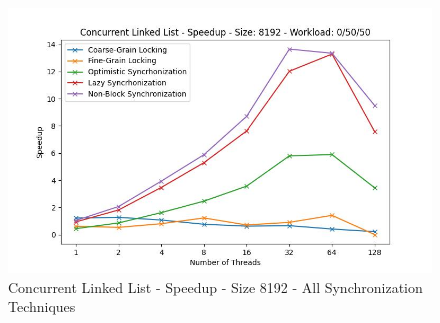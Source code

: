 \documentclass[../final_report.tex]{subfiles}
\begin{document}
\begin{figure}[H]
        \includegraphics[scale=0.4]{outFiles/plots/concurrent_data_structs_all_speedup_8192_0_50_50.jpg}
    \caption{Concurrent Linked List - Speedup - Size 8192 - All Synchronization Techniques}
    \label{fig:Concurrent Linked List - Speedup - Size 8192 - All Synchronization Techniques}
\end{figure}
\end{document}
